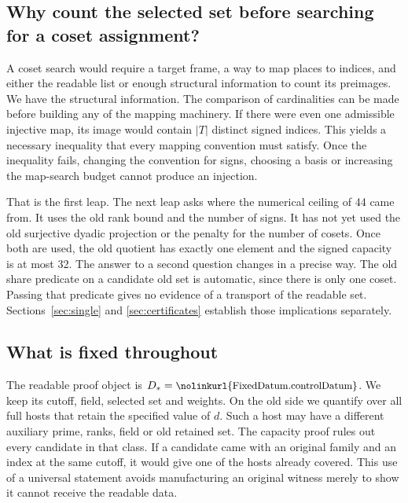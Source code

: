 \documentclass[12pt,letterpaper]{article}
\newcommand{\id}[1]{\ifmmode\text{\small\nolinkurl{#1}}\else{\small\nolinkurl{#1}}\fi}
\begin{document}
\subsection{Why count the selected set before searching for a coset assignment?}
A coset search would require a target frame, a way to map places to indices, and either the readable list or enough structural information to count its preimages. We have the structural information. The comparison of cardinalities can be made before building any of the mapping machinery. If there were even one admissible injective map, its image would contain $|T|$ distinct signed indices. This yields a necessary inequality that every mapping convention must satisfy. Once the inequality fails, changing the convention for signs, choosing a basis or increasing the map-search budget cannot produce an injection.

That is the first leap. The next leap asks where the numerical ceiling of 44 came from. It uses the old rank bound and the number of signs. It has not yet used the old surjective dyadic projection or the penalty for the number of cosets. Once both are used, the old quotient has exactly one element and the signed capacity is at most 32. The answer to a second question changes in a precise way. The old share predicate on a candidate old set is automatic, since there is only one coset. Passing that predicate gives no evidence of a transport of the readable set. Sections~\ref{sec:single} and \ref{sec:certificates} establish those implications separately.

\subsection{What is fixed throughout}
The readable proof object is $D_*=\id{FixedDatum.controlDatum}$. We keep its cutoff, field, selected set and weights. On the old side we quantify over all full hosts that retain the specified value of $d$. Such a host may have a different auxiliary prime, ranks, field or old retained set. The capacity proof rules out every candidate in that class. If a candidate came with an original family and an index at the same cutoff, it would give one of the hosts already covered. This use of a universal statement avoids manufacturing an original witness merely to show it cannot receive the readable data.
\end{document}
